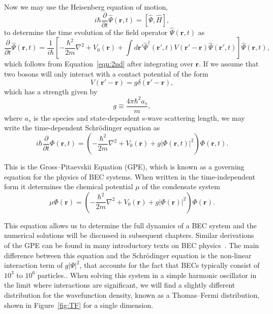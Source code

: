 Now we may use the Heisenberg equation of motion,
\begin{equation}
    i\hbar \frac{\partial}{\partial t}\hat \Psi(\mathbf{r},t) = [\hat \Psi, \hat H],
\end{equation}
    to determine the time evolution of the field operator $\hat \Psi(\mathbf{r},t)$ as
\begin{equation}
    \frac{\partial}{\partial t}\hat \Psi(\mathbf{r},t) = \frac{1}{i\hbar}\left[-\frac{\hbar^2}{2m}\nabla^2 + V_0(\mathbf{r}) + \int d\mathbf{r'} \hat \Psi^\dagger(\mathbf{r'}, t)V(\mathbf{r'} -\mathbf{r})\hat \Psi(\mathbf{r'},t)\right]\hat \Psi(\mathbf{r},t),
\end{equation}
which follows from Equation~\eqref{eqn:2nd} after integrating over $\mathbf{r}$.
If we assume that two bosons will only interact with a contact potential of the form
\begin{equation}
V(\mathbf{r'}-\mathbf{r}) = g\delta(\mathbf{r'} - \mathbf{r}),
\end{equation}
which has a strength given by
\begin{equation}
g \equiv \frac{4 \pi \hbar^2 a_s}{m},
\end{equation}
where $a_s$ is the species and state-dependent s-wave scattering length,
we may write the time-dependent Schr\"odinger equation as
\begin{equation}
    i\hbar \frac{\partial}{\partial t}\Phi(\mathbf{r},t) = \left( - \frac{\hbar^2}{2m} \nabla^2 + V_0(\mathbf{r}) + g |\Phi(\mathbf{r},t)|^2\right)\Phi(\mathbf{r},t).
\end{equation}

\noindent This is the Gross--Pitaevskii Equation (GPE), which is known as a governing equation for the physics of BEC systems.
When written in the time-independent form it determines the chemical potential $\mu$ of the condensate system~\cite{gross1961, pitaevskii1961}
\begin{equation}
    \mu\Phi(\mathbf{r}) = \left( - \frac{\hbar^2}{2m} \nabla^2 + V_0(\mathbf{r}) + g |\Phi(\mathbf{r})|^2\right)\Phi(\mathbf{r}).
    \label{eqn:GP}
\end{equation}

\noindent This equation allows us to determine the full dynamics of a BEC system and the numerical solutions will be discussed in subsequent chapters.
Similar derivations of the GPE can be found in many introductory texts on BEC physics~\cite{fetter2003, pethick2002, fetter2009}.
The main difference between this equation and the Schr\"odinger equation is the non-linear interaction term of $g|\Psi|^2$, that accounts for the fact that BECs typically consist of $10^3$ to $10^6$ particles..
When solving this system in a simple harmonic oscillator in the limit where interactions are significant, we will find a slightly different distribution for the wavefunction density, known as a Thomas--Fermi distribution, shown in Figure~\ref{fig:TF} for a single dimension.

